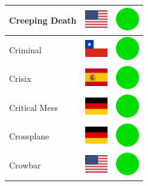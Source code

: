 \documentclass[12pt, a4paper, twoside]{report}
\begin{document}
\begin{center}
\begin{longtable}{|p{5cm}|p{2cm}|p{2cm}|}
Creeping Death & \includegraphics[width=1cm]{4x3/us} & \includegraphics[width=1cm]{likes/y} \\ \hline
Criminal & \includegraphics[width=1cm]{4x3/cl} & \includegraphics[width=1cm]{likes/y} \\ \hline
Crisix & \includegraphics[width=1cm]{4x3/es} & \includegraphics[width=1cm]{likes/y} \\ \hline
Critical Mess & \includegraphics[width=1cm]{4x3/de} & \includegraphics[width=1cm]{likes/y} \\ \hline
Crossplane & \includegraphics[width=1cm]{4x3/de} & \includegraphics[width=1cm]{likes/y} \\ \hline
Crowbar & \includegraphics[width=1cm]{4x3/us} & \includegraphics[width=1cm]{likes/y} \\ \hline

\end{longtable}
\end{center}
\end{document}

